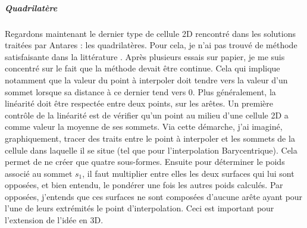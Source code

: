 \newpage

\subparagraph{Quadrilatère}

Regardons maintenant le dernier type de cellule 2D rencontré dans les solutions traitées par Antares : les quadrilatères.
Pour cela, je n'ai pas trouvé de méthode satisfaisante dans la littérature \cite{perronnet1998}. Après plusieurs essais sur papier, je me suis concentré sur le fait que la méthode devait être continue.
Cela qui implique notamment que la valeur du point à interpoler doit tendre vers la valeur d'un sommet lorsque sa distance à ce dernier tend vers 0.
Plus généralement, la linéarité doit être respectée entre deux points, sur les arêtes.
Un première contrôle de la linéarité est de vérifier qu'un point au milieu d'une cellule 2D a comme valeur la moyenne de ses sommets.
Via cette démarche, j'ai imaginé, graphiquement, tracer des traits entre le point à interpoler et les sommets de la cellule dans laquelle il se situe (tel que pour l'interpolation Barycentrique).
Cela permet de ne créer que quatre sous-formes.
Ensuite pour déterminer le poids associé au sommet \( s_1 \), il faut multiplier entre elles les deux surfaces qui lui sont opposées, et bien entendu, le pondérer une fois les autres poids calculés.
Par opposées, j'entends que ces surfaces ne sont composées d'aucune arête ayant pour l'une de leurs extrémités le point d'interpolation. Ceci est important pour l'extension de l'idée en 3D.

